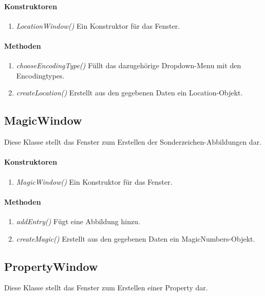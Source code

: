 \paragraph{Konstruktoren}
\begin{enumerate}[+]
	\item \textit{LocationWindow()} Ein Konstruktor für das Fenster.
\end{enumerate}

\paragraph{Methoden}

\begin{enumerate}[+]
	\item \textit{chooseEncodingType()} Füllt das dazugehörige Dropdown-Menu mit den Encodingtypes.
	\item \textit{createLocation()} Erstellt aus den gegebenen Daten ein Location-Objekt.
	
\end{enumerate}




\subsection{MagicWindow}
Diese Klasse stellt das Fenster zum Erstellen der Sonderzeichen-Abbildungen dar.

\paragraph{Konstruktoren}
\begin{enumerate}[+]
	\item \textit{MagicWindow()} Ein Konstruktor für das Fenster.
\end{enumerate}

\paragraph{Methoden}

\begin{enumerate}[+]
	\item \textit{addEntry()} Fügt eine Abbildung hinzu.
	\item \textit{createMagic()} Erstellt aus den gegebenen Daten ein MagicNumbers-Objekt.	
\end{enumerate}



\subsection{PropertyWindow}
Diese Klasse stellt das Fenster zum Erstellen einer Property dar.

